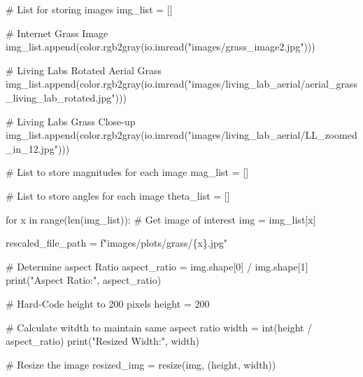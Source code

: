 \documentclass[
  letterpaper,
  DIV=11,
  numbers=noendperiod]{scrreprt}
\newenvironment{Shaded}{\begin{snugshade}}{\end{snugshade}}
\newcommand{\BuiltInTok}[1]{\textcolor[rgb]{0.00,0.23,0.31}{#1}}
\newcommand{\CommentTok}[1]{\textcolor[rgb]{0.37,0.37,0.37}{#1}}
\newcommand{\ControlFlowTok}[1]{\textcolor[rgb]{0.00,0.23,0.31}{#1}}
\newcommand{\DecValTok}[1]{\textcolor[rgb]{0.68,0.00,0.00}{#1}}
\newcommand{\KeywordTok}[1]{\textcolor[rgb]{0.00,0.23,0.31}{#1}}
\newcommand{\NormalTok}[1]{\textcolor[rgb]{0.00,0.23,0.31}{#1}}
\newcommand{\OperatorTok}[1]{\textcolor[rgb]{0.37,0.37,0.37}{#1}}
\newcommand{\SpecialCharTok}[1]{\textcolor[rgb]{0.37,0.37,0.37}{#1}}
\newcommand{\SpecialStringTok}[1]{\textcolor[rgb]{0.13,0.47,0.30}{#1}}
\newcommand{\StringTok}[1]{\textcolor[rgb]{0.13,0.47,0.30}{#1}}
\begin{document}
\begin{Shaded}
\begin{Highlighting}[]
\CommentTok{\# List for storing images}
\NormalTok{img\_list }\OperatorTok{=}\NormalTok{ []}

\CommentTok{\# Internet Grass Image}
\NormalTok{img\_list.append(color.rgb2gray(io.imread(}\StringTok{"images/grass\_image2.jpg"}\NormalTok{)))}

\CommentTok{\# Living Labs Rotated Aerial Grass}
\NormalTok{img\_list.append(color.rgb2gray(io.imread(}\StringTok{"images/living\_lab\_aerial/aerial\_grass\_living\_lab\_rotated.jpg"}\NormalTok{)))}

\CommentTok{\# Living Labs Grass Close{-}up}
\NormalTok{img\_list.append(color.rgb2gray(io.imread(}\StringTok{"images/living\_lab\_aerial/LL\_zoomed\_in\_12.jpg"}\NormalTok{)))}

\CommentTok{\# List to store magnitudes for each image}
\NormalTok{mag\_list }\OperatorTok{=}\NormalTok{ []}

\CommentTok{\# List to store angles for each image}
\NormalTok{theta\_list }\OperatorTok{=}\NormalTok{ []}


\ControlFlowTok{for}\NormalTok{ x }\KeywordTok{in} \BuiltInTok{range}\NormalTok{(}\BuiltInTok{len}\NormalTok{(img\_list)):}
    \CommentTok{\# Get image of interest}
\NormalTok{    img }\OperatorTok{=}\NormalTok{ img\_list[x]}
    
\NormalTok{    rescaled\_file\_path }\OperatorTok{=} \SpecialStringTok{f"images/plots/grass/}\SpecialCharTok{\{}\NormalTok{x}\SpecialCharTok{\}}\SpecialStringTok{.jpg"}
    
    \CommentTok{\# Determine aspect Ratio}
\NormalTok{    aspect\_ratio }\OperatorTok{=}\NormalTok{ img.shape[}\DecValTok{0}\NormalTok{] }\OperatorTok{/}\NormalTok{ img.shape[}\DecValTok{1}\NormalTok{]}
    \BuiltInTok{print}\NormalTok{(}\StringTok{"Aspect Ratio:"}\NormalTok{, aspect\_ratio)}
    
    \CommentTok{\# Hard{-}Code height to 200 pixels}
\NormalTok{    height }\OperatorTok{=} \DecValTok{200}
    
    \CommentTok{\# Calculate witdth to maintain same aspect ratio}
\NormalTok{    width }\OperatorTok{=} \BuiltInTok{int}\NormalTok{(height }\OperatorTok{/}\NormalTok{ aspect\_ratio)}
    \BuiltInTok{print}\NormalTok{(}\StringTok{"Resized Width:"}\NormalTok{, width)}
    
    \CommentTok{\# Resize the image}
\NormalTok{    resized\_img }\OperatorTok{=}\NormalTok{ resize(img, (height, width))}
    

\end{Highlighting}
\end{Shaded}
\end{document}
